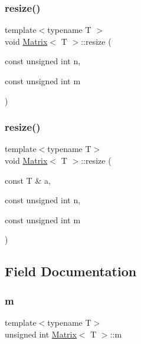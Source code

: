 \subsubsection{\texorpdfstring{resize()}{resize()}\hspace{0.1cm}{\footnotesize\ttfamily [1/2]}}
{\footnotesize\ttfamily template$<$typename T $>$ \\
void \mbox{\hyperlink{classMatrix}{Matrix}}$<$ T $>$\+::resize (\begin{DoxyParamCaption}\item[{const unsigned int}]{n,  }\item[{const unsigned int}]{m }\end{DoxyParamCaption})\hspace{0.3cm}{\ttfamily [inline]}}

\mbox{\label{classMatrix_ae866a1b312aa040b587b40c5f54b6a54_ae866a1b312aa040b587b40c5f54b6a54}} 
\subsubsection{\texorpdfstring{resize()}{resize()}\hspace{0.1cm}{\footnotesize\ttfamily [2/2]}}
{\footnotesize\ttfamily template$<$typename T$>$ \\
void \mbox{\hyperlink{classMatrix}{Matrix}}$<$ T $>$\+::resize (\begin{DoxyParamCaption}\item[{const T \&}]{a,  }\item[{const unsigned int}]{n,  }\item[{const unsigned int}]{m }\end{DoxyParamCaption})\hspace{0.3cm}{\ttfamily [inline]}}



\subsection{Field Documentation}
\mbox{\label{classMatrix_a0a922a1712cf7e9afb32fd8fff6809df_a0a922a1712cf7e9afb32fd8fff6809df}} 
\subsubsection{\texorpdfstring{m}{m}}
{\footnotesize\ttfamily template$<$typename T$>$ \\
unsigned int \mbox{\hyperlink{classMatrix}{Matrix}}$<$ T $>$\+::m\hspace{0.3cm}{\ttfamily [private]}}

